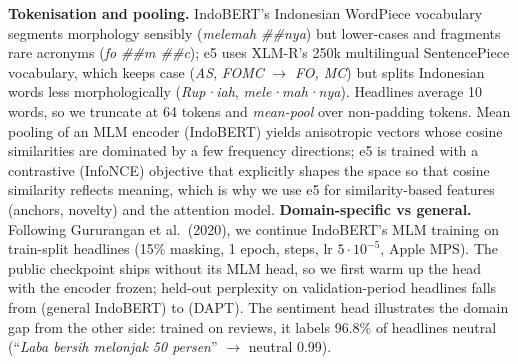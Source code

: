 \documentclass[10pt,a4paper]{article}
\begin{document}
\textbf{Tokenisation and pooling.} IndoBERT's Indonesian WordPiece vocabulary segments morphology sensibly (\emph{melemah \#\#nya}) but lower-cases and fragments rare acronyms (\emph{fo \#\#m \#\#c}); e5 uses XLM-R's 250k multilingual SentencePiece vocabulary, which keeps case (\emph{AS}, \emph{FOMC} $\to$ \emph{FO, MC}) but splits Indonesian words less morphologically (\emph{Rup·iah}, \emph{mele·mah·nya}). Headlines average 10 words, so we truncate at 64 tokens and \emph{mean-pool} over non-padding tokens. Mean pooling of an MLM encoder (IndoBERT) yields anisotropic vectors whose cosine similarities are dominated by a few frequency directions; e5 is trained with a contrastive (InfoNCE) objective that explicitly shapes the space so that cosine similarity reflects meaning, which is why we use e5 for similarity-based features (anchors, novelty) and the attention model.
\textbf{Domain-specific vs general.} Following Gururangan et al.\ (2020), we continue IndoBERT's MLM training on train-split headlines (15\% masking, 1 epoch, \DaptSteps{} steps, lr $5\cdot10^{-5}$, Apple MPS). The public checkpoint ships without its MLM head, so we first warm up the head with the encoder frozen; held-out perplexity on validation-period headlines falls from \PplGeneral{} (general IndoBERT) to \PplDapt{} (DAPT). The sentiment head illustrates the domain gap from the other side: trained on reviews, it labels 96.8\% of headlines neutral (``\emph{Laba bersih melonjak 50 persen}'' $\to$ neutral 0.99).
\end{document}
